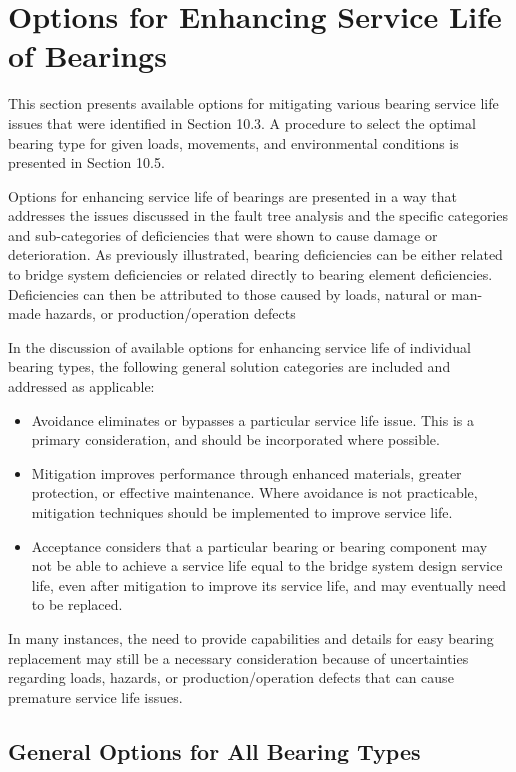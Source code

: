 \section{Options for Enhancing Service Life of Bearings}
This section presents available options for mitigating various bearing service life issues that were identified in
Section 10.3. A procedure to select the optimal bearing type for given loads, movements, and environmental
conditions is presented in Section 10.5.

Options for enhancing service life of bearings are presented in a way that addresses the issues discussed in the
fault tree analysis and the specific categories and sub-categories of deficiencies that were shown to cause damage or
deterioration. As previously illustrated, bearing deficiencies can be either related to bridge system deficiencies or
related directly to bearing element deficiencies. Deficiencies can then be attributed to those caused by loads, natural
or man-made hazards, or production/operation defects

In the discussion of available options for enhancing service life of individual bearing types, the following general
solution categories are included and addressed as applicable:

\begin{itemize}
  \item Avoidance eliminates or bypasses a particular service life issue. This is a primary consideration, and should
  be incorporated where possible.
  \item Mitigation improves performance through enhanced materials, greater protection, or effective maintenance.
  Where avoidance is not practicable, mitigation techniques should be implemented to improve service life.
  \item Acceptance considers that a particular bearing or bearing component may not be able to achieve a service life
  equal to the bridge system design service life, even after mitigation to improve its service life, and may
  eventually need to be replaced.
\end{itemize}

In many instances, the need to provide capabilities and details for easy bearing replacement may still be a
necessary consideration because of uncertainties regarding loads, hazards, or production/operation defects that can
cause premature service life issues.

\subsection{General Options for All Bearing Types}

